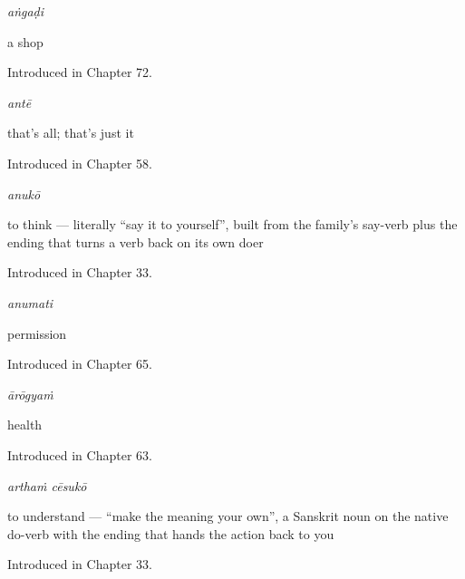 \noindent\begin{minipage}[t]{\linewidth}
\raggedright
\textbf{}\enspace\emph{aṅgaḍi}\par
\small a shop\par
\footnotesize Introduced in Chapter 72.
\end{minipage}\par\medskip

\noindent\begin{minipage}[t]{\linewidth}
\raggedright
\textbf{}\enspace\emph{antē}\par
\small that's all; that's just it\par
\footnotesize Introduced in Chapter 58.
\end{minipage}\par\medskip

\noindent\begin{minipage}[t]{\linewidth}
\raggedright
\textbf{}\enspace\emph{anukō}\par
\small to think — literally \textquotedblleft{}say it to yourself\textquotedblright{}, built from the family's say-verb plus the ending that turns a verb back on its own doer\par
\footnotesize Introduced in Chapter 33.
\end{minipage}\par\medskip

\noindent\begin{minipage}[t]{\linewidth}
\raggedright
\textbf{}\enspace\emph{anumati}\par
\small permission\par
\footnotesize Introduced in Chapter 65.
\end{minipage}\par\medskip

\noindent\begin{minipage}[t]{\linewidth}
\raggedright
\textbf{}\enspace\emph{ārōgyaṁ}\par
\small health\par
\footnotesize Introduced in Chapter 63.
\end{minipage}\par\medskip

\noindent\begin{minipage}[t]{\linewidth}
\raggedright
\textbf{ }\enspace\emph{arthaṁ cēsukō}\par
\small to understand — \textquotedblleft{}make the meaning your own\textquotedblright{}, a Sanskrit noun on the native do-verb with the ending that hands the action back to you\par
\footnotesize Introduced in Chapter 33.
\end{minipage}\par\medskip

